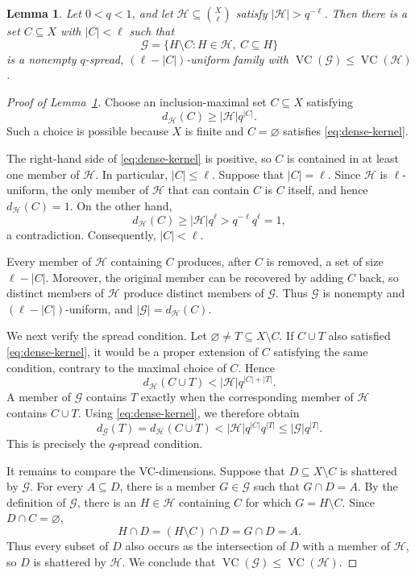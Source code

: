 \documentclass[10pt,a4paper]{amsart}
\newtheorem{lemma}[theorem]{Lemma}
\newcommand*{\abs}[1]{\lvert#1\rvert}
\newcommand{\cG}{\mathcal{G}}
\newcommand{\cH}{\mathcal{H}}
\newcommand{\VC}{\operatorname{VC}}
\begin{document}
\begin{lemma}\label{lem:maximal-kernel}
Let \(0<q<1\), and let \(\cH\subseteq\binom{X}{\ell}\) satisfy \(\abs{\cH}>q^{-\ell}\). Then there is a set \(C\subseteq X\) with \(\abs{C}<\ell\) such that
\[
\cG=\{H\setminus C:H\in\cH,\ C\subseteq H\}
\]
is a nonempty \(q\)-spread, \((\ell-\abs{C})\)-uniform family with \(\VC(\cG)\le\VC(\cH)\).
\end{lemma}

\begin{proof}[Proof of Lemma~\ref{lem:maximal-kernel}]
Choose an inclusion-maximal set \(C\subseteq X\) satisfying
\begin{equation}\label{eq:dense-kernel}
d_{\cH}(C)\ge \abs{\cH}q^{\abs{C}}.
\end{equation}
Such a choice is possible because \(X\) is finite and \(C=\varnothing\) satisfies \eqref{eq:dense-kernel}.

The right-hand side of \eqref{eq:dense-kernel} is positive, so \(C\) is contained in at least one member of \(\cH\). In particular, \(\abs{C}\le\ell\). Suppose that \(\abs{C}=\ell\). Since \(\cH\) is \(\ell\)-uniform, the only member of \(\cH\) that can contain \(C\) is \(C\) itself, and hence \(d_{\cH}(C)=1\). On the other hand,
\[
d_{\cH}(C)\ge\abs{\cH}q^{\ell}>q^{-\ell}q^{\ell}=1,
\]
a contradiction. Consequently, \(\abs{C}<\ell\).

Every member of \(\cH\) containing \(C\) produces, after \(C\) is removed, a set of size \(\ell-\abs{C}\). Moreover, the original member can be recovered by adding \(C\) back, so distinct members of \(\cH\) produce distinct members of \(\cG\). Thus \(\cG\) is nonempty and \((\ell-\abs{C})\)-uniform, and
\(
\abs{\cG}=d_{\cH}(C).
\)

We next verify the spread condition. Let \(\varnothing\ne T\subseteq X\setminus C\). If \(C\cup T\) also satisfied \eqref{eq:dense-kernel}, it would be a proper extension of \(C\) satisfying the same condition, contrary to the maximal choice of \(C\). Hence
\[
d_{\cH}(C\cup T)<\abs{\cH}q^{\abs{C}+\abs{T}}.
\]
A member of \(\cG\) contains \(T\) exactly when the corresponding member of \(\cH\) contains \(C\cup T\). Using \eqref{eq:dense-kernel}, we therefore obtain
\[
d_{\cG}(T)=d_{\cH}(C\cup T)
<\abs{\cH}q^{\abs{C}}q^{\abs{T}}
\le\abs{\cG}q^{\abs{T}}.
\]
This is precisely the \(q\)-spread condition.

It remains to compare the VC-dimensions. Suppose that \(D\subseteq X\setminus C\) is shattered by \(\cG\). For every \(A\subseteq D\), there is a member \(G\in\cG\) such that \(G\cap D=A\). By the definition of \(\cG\), there is an \(H\in\cH\) containing \(C\) for which \(G=H\setminus C\). Since \(D\cap C=\varnothing\),
\[
H\cap D=(H\setminus C)\cap D=G\cap D=A.
\]
Thus every subset of \(D\) also occurs as the intersection of \(D\) with a member of \(\cH\), so \(D\) is shattered by \(\cH\). We conclude that \(\VC(\cG)\le\VC(\cH)\).
\end{proof}
\end{document}
